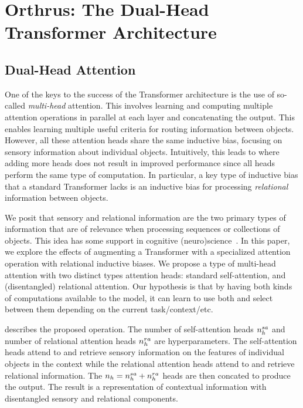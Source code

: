 \section{Orthrus: The Dual-Head Transformer Architecture}

\subsection{Dual-Head Attention}

One of the keys to the success of the Transformer architecture is the use of so-called \textit{multi-head} attention. This involves learning and computing multiple attention operations in parallel at each layer and concatenating the output. This enables learning multiple useful criteria for routing information between objects. However, all these attention heads share the same inductive bias, focusing on sensory information about individual objects. Intuitively, this leads to  where adding more heads does not result in improved performance since all heads perform the same type of computation. In particular, a key type of inductive bias that a standard Transformer lacks is an inductive bias for processing \textit{relational} information between objects.

We posit that sensory and relational information are the two primary types of information that are of relevance when processing sequences or collections of objects. This idea has some support  in cognitive (neuro)science~\citep{citation}. In this paper, we explore the effects of augmenting a Transformer with a specialized attention operation with relational inductive biases. We propose a type of multi-head attention with two distinct types attention heads: standard self-attention, and (disentangled) relational attention. Our hypothesis is that by having both kinds of computations available to the model, it can learn to use both and select between them depending on the current task/context/etc.

 describes the proposed operation. The number of self-attention heads $n_h^{sa}$ and number of relational attention heads $n_h^{ra}$ are hyperparameters. The self-attention heads attend to and retrieve sensory information on the features of individual objects in the context while the relational attention heads attend to and retrieve relational information. The $n_h = n_h^{sa} + n_h^{ra}$ heads are then concated to produce the output. The result is a representation of contextual information with disentangled sensory and relational components.

